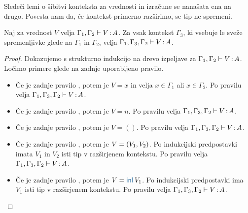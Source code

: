 Sledeči lemi o šibitvi konteksta za vrednosti in izračune se nanašata ena na drugo. Povesta nam da, če kontekst primerno razširimo, se tip ne spremeni.

\begin{lema}\label{lem:weakening-values}
	Naj za vrednost $V$ velja $\Gamma_1, \Gamma_2 \vdash V \mathinner{:} A$. Za vsak kontekst $\Gamma_3$, ki vsebuje le sveže spremenljivke glede na $\Gamma_1$ in $\Gamma_2$, velja $\Gamma_1, \Gamma_3, \Gamma_2 \vdash V \mathinner{:} A$.
\end{lema}

\begin{proof}
	Dokazujemo s strukturno indukcijo na drevo izpeljave za $\Gamma_1, \Gamma_2 \vdash V \mathinner{:} A$.
	Ločimo primere glede na zadnje uporabljeno pravilo.
	
	\begin{itemize}
		\item[\sitem] Če je zadnje pravilo , potem je $V = x$ in velja $x \in \Gamma_1$ ali $x \in \Gamma_2$. Po pravilu  velja $\Gamma_1, \Gamma_3, \Gamma_2 \vdash V \mathinner{:} A$.
		
		\item Če je zadnje pravilo , potem je $V = n$. Po pravilu  velja $\Gamma_1, \Gamma_3, \Gamma_2 \vdash V \mathinner{:} A$.
		
		\item Če je zadnje pravilo , potem je $V = ()$. Po pravilu  velja $\Gamma_1, \Gamma_3, \Gamma_2 \vdash V \mathinner{:} A$.
		
		\item Če je zadnje pravilo , potem je $V =( V_1 , V_2 )$. Po indukcijski predpostavki imata $V_1$ in $V_2$ isti tip v razširjenem kontekstu.
		Po pravilu  velja $\Gamma_1, \Gamma_3, \Gamma_2 \vdash V \mathinner{:} A$.
		
		\item Če je zadnje pravilo , potem je $V = \tminl{V_1}$. Po indukcijski predpostavki ima $V_1$ isti tip v razširjenem kontekstu.
		Po pravilu  velja $\Gamma_1, \Gamma_3, \Gamma_2 \vdash V \mathinner{:} A$.
		

\end{itemize}
\end{proof}
